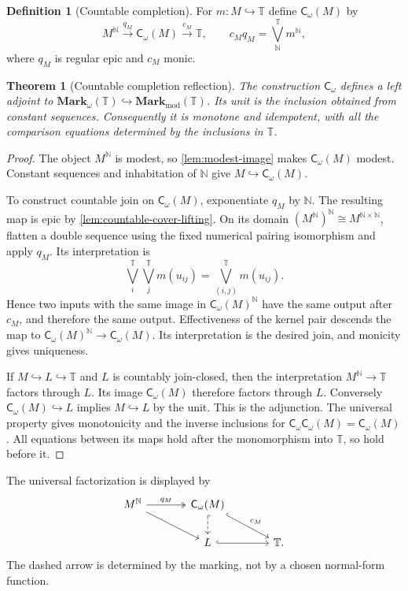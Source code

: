 \documentclass[11pt,a4paper]{article}
\numberwithin{equation}{section}
\newtheorem{theorem}{Theorem}[section]
\theoremstyle{definition}
\newtheorem{definition}[definition]{Definition}
\theoremstyle{remark}
\theoremstyle{plain}
\newcommand{\N}{\mathbb N}
\newcommand{\TV}{\mathbb T}
\newcommand{\incl}{\hookrightarrow}
\newcommand{\Cw}{\mathsf C_{\omega}}
\newcommand{\Mark}{\mathbf{Mark}_{\mathrm{mod}}}
\newcommand{\JoinMark}{\mathbf{Mark}_{\omega}}
\newcommand{\joinT}{\bigvee^{\TV}}
\begin{document}
\begin{definition}[Countable completion]
\label{def:countable-completion}
For $m:M\incl\TV$ define $\Cw(M)$ by
\begin{equation}\label{eq:countable-image}
 M^{\N}\xrightarrow{q_M}\Cw(M)\xrightarrow{c_M}\TV,
 \qquad c_Mq_M=\joinT_{\N}m^{\N},
\end{equation}
where $q_M$ is regular epic and $c_M$ monic.
\end{definition}

\begin{theorem}[Countable completion reflection]
\label{thm:countable-completion-reflection}
The construction $\Cw$ defines a left adjoint to
$\JoinMark(\TV)\incl\Mark(\TV)$. Its unit is the inclusion obtained
from constant sequences. Consequently it is monotone and idempotent,
with all the comparison equations determined by the inclusions in $\TV$.
\end{theorem}
\begin{proof}
The object $M^{\N}$ is modest, so \cref{lem:modest-image} makes
$\Cw(M)$ modest. Constant sequences and inhabitation of $\N$ give
$M\incl\Cw(M)$.

To construct countable join on $\Cw(M)$, exponentiate $q_M$ by $\N$.
The resulting map is epic by \cref{lem:countable-cover-lifting}. On its
domain $(M^{\N})^{\N}\cong M^{\N\times\N}$, flatten a double sequence
using the fixed numerical pairing isomorphism and apply $q_M$. Its
interpretation is
\[
 \joinT_i\joinT_j m(u_{ij})=\joinT_{(i,j)}m(u_{ij}).
\]
Hence two inputs with the same image in $\Cw(M)^{\N}$ have the same
output after $c_M$, and therefore the same output. Effectiveness of the
kernel pair descends the map to $\Cw(M)^{\N}\to\Cw(M)$.
Its interpretation is the desired join, and monicity gives uniqueness.

If $M\incl L\incl\TV$ and $L$ is countably join-closed, then the
interpretation $M^{\N}\to\TV$ factors through $L$. Its image
$\Cw(M)$ therefore factors through $L$. Conversely
$\Cw(M)\incl L$ implies $M\incl L$ by the unit. This is the
adjunction. The universal property gives monotonicity and the inverse
inclusions for $\Cw\Cw(M)=\Cw(M)$. All equations between its maps
hold after the monomorphism into $\TV$, so hold before it.
\end{proof}

The universal factorization is displayed by
\begin{equation}\label{diag:completion-universal}
\begin{tikzcd}[column sep=large]
 M^{\N}\ar[r,two heads,"q_M"]\ar[dr]&
 \Cw(M)\ar[d,hook,dashed]\ar[dr,hook,"c_M"]&\\
 &L\ar[r,hook]&\TV.
\end{tikzcd}
\end{equation}
The dashed arrow is determined by the marking, not by a chosen
normal-form function.
\end{document}
